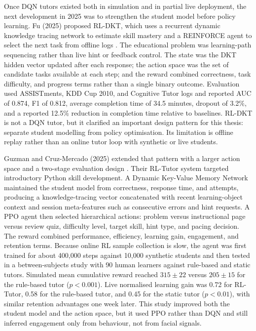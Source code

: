 Once \ac{DQN} tutors existed both in simulation and in partial live deployment, the next development in 2025 was to strengthen the student model before policy learning. Fu (2025) proposed \ac{RL}-DKT, which uses a recurrent dynamic knowledge tracing network to estimate skill mastery and a REINFORCE agent to select the next task from offline logs \cite{fu_integrating_2025}. The educational problem was learning-path sequencing rather than live hint or feedback control. The state was the DKT hidden vector updated after each response; the action space was the set of candidate tasks available at each step; and the reward combined correctness, task difficulty, and progress terms rather than a single binary outcome. Evaluation used ASSISTments, KDD Cup 2010, and Cognitive Tutor logs and reported AUC of 0.874, F1 of 0.812, average completion time of 34.5 minutes, dropout of 3.2\%, and a reported 12.5\% reduction in completion time relative to baselines. \ac{RL}-DKT is not a \ac{DQN} tutor, but it clarified an important design pattern for this thesis: separate student modelling from policy optimisation. Its limitation is offline replay rather than an online tutor loop with synthetic or live students.

Guzman and Cruz-Mercado (2025) extended that pattern with a larger action space and a two-stage evaluation design \cite{guzman_developing_2025}. Their \ac{RL}-Tutor system targeted introductory Python skill development. A Dynamic Key-Value Memory Network maintained the student model from correctness, response time, and attempts, producing a knowledge-tracing vector concatenated with recent learning-object context and session meta-features such as consecutive errors and hint requests. A \ac{PPO} agent then selected hierarchical actions: problem versus instructional page versus review quiz, difficulty level, target skill, hint type, and pacing decision. The reward combined performance, efficiency, learning gain, engagement, and retention terms. Because online \ac{RL} sample collection is slow, the agent was first trained for about 400{,}000 steps against 10{,}000 synthetic students and then tested in a between-subjects study with 90 human learners against rule-based and static tutors. Simulated mean cumulative reward reached $315 \pm 22$ versus $205 \pm 15$ for the rule-based tutor ($p<0.001$). Live normalised learning gain was 0.72 for \ac{RL}-Tutor, 0.58 for the rule-based tutor, and 0.45 for the static tutor ($p<0.01$), with similar retention advantages one week later. This study improved both the student model and the action space, but it used \ac{PPO} rather than \ac{DQN} and still inferred engagement only from behaviour, not from facial signals.

